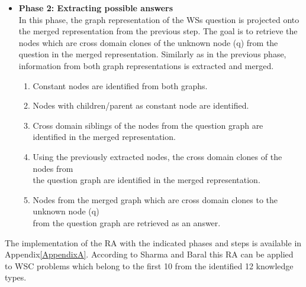 \begin{itemize}
	\item \textbf{Phase 2: Extracting possible answers}\\
	In this phase, the graph representation of the WSs question is projected onto the merged representation from the previous step. The goal is to retrieve the nodes which are cross domain clones of the unknown node (q) from the question in the merged representation. Similarly as in the previous phase, information from both graph representations is extracted and merged.
	\begin{enumerate}
		\item Constant nodes are identified from both graphs.
		\item Nodes with children/parent as constant node are identified. 
		\item Cross domain siblings of the nodes from the question graph are \\ identified in the merged representation.
		\item Using the previously extracted nodes, the cross domain clones of the nodes from\\ the question graph are identified in the merged representation.
		\item Nodes from the merged graph which are cross domain clones to the unknown node (q)\\ from the question graph are retrieved as an answer.
	\end{enumerate}
\end{itemize}

The implementation of the RA with the indicated phases and steps is available in Appendix\ref{AppendixA}. 
According to Sharma and Baral \cite{2018CommonsenseKT} this RA can be applied to WSC problems which belong to the first 10 from the identified 12 knowledge types. 

